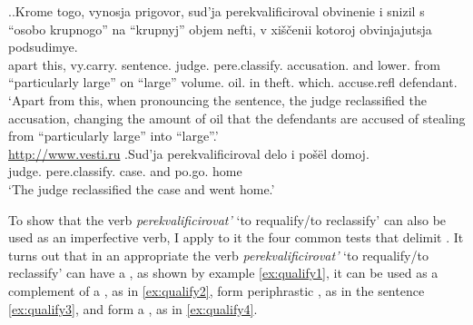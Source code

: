 \ex.\ag.\label{ex:perekvalificirovat:perf}Krome togo, vynosja prigovor, sud'ja perekvalificiroval\textsuperscript{\PF} obvinenie i snizil s ``osobo krupnogo'' na ``krupnyj'' objem nefti, v xi\v{s}\v{c}enii kotoroj obvinjajutsja podsudimye.\\
apart this, vy.carry. sentence. judge. pere.classify. accusation. and lower. from ``particularly large'' on ``large'' volume. oil. in theft. which. accuse.refl defendant.\\
\trans `Apart from this, when pronouncing the sentence, the judge reclassified the accusation, changing the amount of oil that the defendants are accused of stealing from ``particularly large'' into ``large''.'\\
\hbox{}\hfill\hbox{\url{http://www.vesti.ru}}
\bg.\label{ex:perekvalificirovat:perf2}Sud'ja perekvalificiroval\textsuperscript{\PF} delo i po\v{s}\"{e}l domoj.\\
judge. pere.classify. case. and po.go. home\\
\trans `The judge reclassified the case and went home.'

To show that the verb \textit{perekvalificirovat'} `to requalify/to reclassify' can also be used as an imperfective verb, I apply to it the four common tests that delimit . It turns out that in an appropriate  the verb \textit{perekvalificirovat'} `to requalify/to reclassify' can have a , as shown by example \ref{ex:qualify1}, it can be used as a complement of a , as in \ref{ex:qualify2}, form periphrastic , as in the sentence \ref{ex:qualify3}, and form a , as in \ref{ex:qualify4}. 

